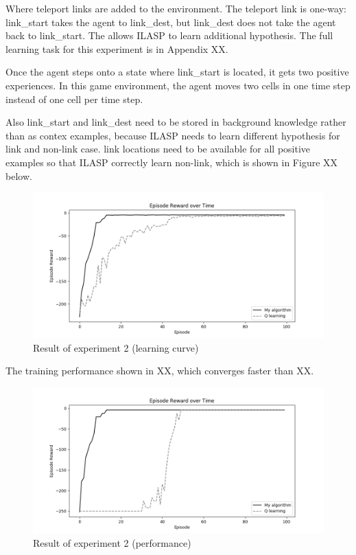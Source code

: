 Where teleport links are added to the environment. The teleport link is one-way: link\_start takes the agent to link\_dest, but link\_dest does not take the agent back to link\_start.
The allows ILASP to learn additional hypothesis.
The full learning task for this experiment is in Appendix XX.

Once the agent steps onto a state where link\_start is located, it gets two positive experiences.
In this game environment, the agent moves two cells in one time step instead of one cell per time step.

Also link\_start and link\_dest need to be stored in background knowledge rather than as contex examples,
because ILASP needs to learn different hypothesis for link and non-link case.
link locations need to be available for all positive examples so that ILASP correctly learn non-link, which is shown in Figure XX below.

\begin{figure}[!htb]
\centering
\includegraphics[width=1.0\textwidth]{./figures/experiment2_training}
\caption{Result of experiment 2 (learning curve)}
\label{experiment2_training}
\end{figure}

The training performance shown in XX, which converges faster than XX.

\begin{figure}[!htb]
\centering
\includegraphics[width=1.0\textwidth]{./figures/experiment2_test}
\caption{Result of experiment 2 (performance)}
\label{experiment2_test}
\end{figure}

